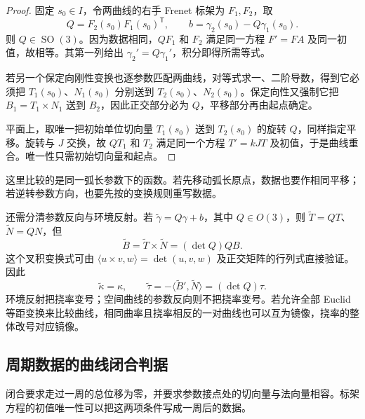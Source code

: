 \begin{proof}
	固定 \(s_0\in I\)，令两曲线的右手 Frenet 标架为 \(F_1,F_2\)，取
	\[
		Q=F_2(s_0)F_1(s_0)^{\mathsf T},\qquad
		b=\gamma_2(s_0)-Q\gamma_1(s_0).
	\]
	则 \(Q\in \operatorname{SO}(3)\)。因为数据相同，\(QF_1\) 和 \(F_2\) 满足同一方程 \(F'=FA\) 及同一初值，故相等。其第一列给出 \(\gamma_2'=Q\gamma_1'\)，积分即得所需等式。

	若另一个保定向刚性变换也逐参数匹配两曲线，对等式求一、二阶导数，得到它必须把 \(T_1(s_0)\)、\(N_1(s_0)\) 分别送到 \(T_2(s_0)\)、\(N_2(s_0)\)。保定向性又强制它把 \(B_1=T_1\times N_1\) 送到 \(B_2\)，因此正交部分必为 \(Q\)，平移部分再由起点确定。

	平面上，取唯一把初始单位切向量 \(T_1(s_0)\) 送到 \(T_2(s_0)\) 的旋转 \(Q\)，同样指定平移。旋转与 \(J\) 交换，故 \(QT_1\) 和 \(T_2\) 满足同一个方程 \(T'=kJT\) 及初值，于是曲线重合。唯一性只需初始切向量和起点。
\end{proof}

这里比较的是同一弧长参数下的函数。若先移动弧长原点，数据也要作相同平移；若逆转参数方向，也要先按的变换规则重写数据。

\ProseParagraphBreak

还需分清参数反向与环境反射。若 \(\widetilde\gamma=Q\gamma+b\)，其中 \(Q\in O(3)\)，则 \(\widetilde T=QT\)、\(\widetilde N=QN\)，但
\[
	\widetilde B=\widetilde T\times\widetilde N=(\det Q)QB.
\]
这个叉积变换式可由 \(\langle u\times v,w\rangle=\det(u,v,w)\) 及正交矩阵的行列式直接验证。因此
\[
	\widetilde\kappa=\kappa,\qquad
	\widetilde\tau=-\langle\widetilde B',\widetilde N\rangle=(\det Q)\tau.
\]
环境反射把挠率变号；空间曲线的参数反向则不把挠率变号。若允许全部 Euclid 等距变换来比较曲线，相同曲率且挠率相反的一对曲线也可以互为镜像，挠率的整体改号对应镜像。

\subsection{周期数据的曲线闭合判据}
\label{g1:subsec:0702:04}

闭合要求走过一周的总位移为零，并要求参数接点处的切向量与法向量相容。标架方程的初值唯一性可以把这两项条件写成一周后的数据。

